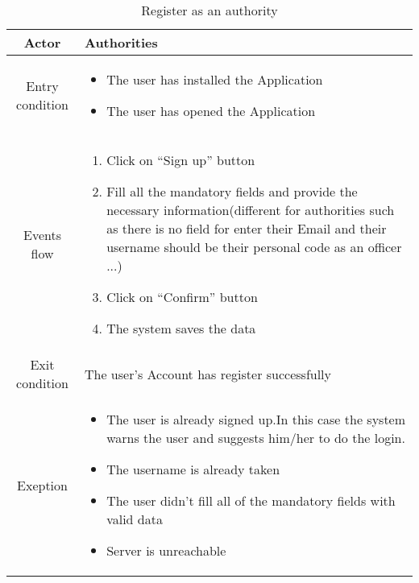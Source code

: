 \documentclass{article}
\begin{document}
		\begin{table} [H]
		\begin{center}
		\caption{Register as an authority}
		\begin{tabular}{|c|p{8cm}|}
			\hline
			Actor&Authorities\\
			\hline
			Entry condition&\begin{itemize}
								\item The user has installed the Application
								\item The user has opened the Application
							\end{itemize}\\
			\hline
			Events flow & \begin{enumerate}
							\item Click on “Sign up” button
							\item Fill all the mandatory fields and provide the necessary information(different for authorities such as there is no field for enter their Email and their username should be their personal code as an officer ...)
							\item Click on “Confirm” button
							\item The system saves the data
						\end{enumerate}\\
			\hline
			Exit condition& The user's Account has register successfully\\
			\hline
			Exeption& \begin{itemize}
							\item The user is already signed up.In this case the system warns the user and suggests him/her to do the login.
							\item The username is already taken
							\item The user didn’t fill all of the mandatory fields with valid data
							\item Server is unreachable
						\end{itemize}\\
			\hline
		\end{tabular}
		\end{center}
		\end{table} 
	
\end{document}
